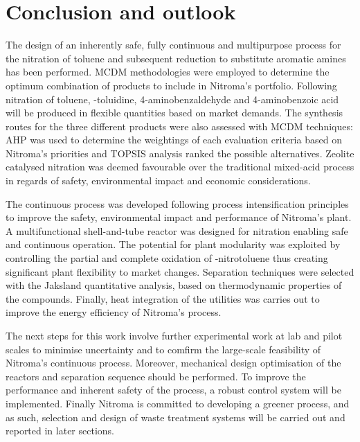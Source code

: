 \section{Conclusion and outlook}

The design of an inherently safe, fully continuous and multipurpose process for the nitration of toluene and subsequent reduction to substitute aromatic amines has been performed. MCDM methodologies were employed to determine the optimum combination of products to include in Nitroma's portfolio. Following nitration of toluene, \ortho-toluidine, 4-aminobenzaldehyde and 4-aminobenzoic acid will be produced in flexible quantities based on market demands. The synthesis routes for the three different products were also assessed with MCDM techniques: AHP was used to determine the weightings of each evaluation criteria based on Nitroma's priorities and TOPSIS analysis ranked the possible alternatives. Zeolite catalysed nitration was deemed favourable over the traditional mixed-acid process in regards of safety, environmental impact and economic considerations. 

The continuous process was developed following process intensification principles to improve the safety, environmental impact and performance of Nitroma's plant. A multifunctional shell-and-tube reactor was designed for nitration enabling safe and continuous operation. The potential for plant modularity was exploited by controlling the partial and complete oxidation of \para-nitrotoluene thus creating significant plant flexibility to market changes. Separation techniques were selected with the Jaksland quantitative analysis, based on thermodynamic properties of the compounds. Finally, heat integration of the utilities was carries out to improve the energy efficiency of Nitroma's process.

The next steps for this work involve further experimental work at lab and pilot scales to minimise uncertainty and to comfirm the large-scale feasibility of Nitroma's continuous process. Moreover, mechanical design optimisation of the reactors and separation sequence should be performed. To improve the performance and inherent safety of the process, a robust control system will be implemented. Finally Nitroma is committed to developing a greener process, and as such, selection and design of waste treatment systems will be carried out and reported in later sections.
